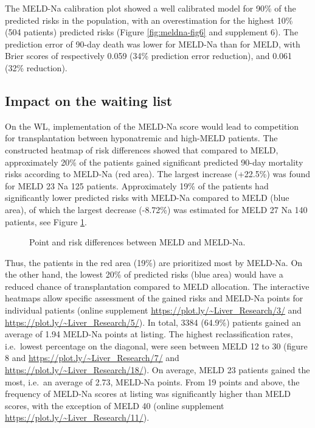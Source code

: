 \documentclass[11pt,english,]{book} %
\begin{document}
The MELD-Na calibration plot showed a well calibrated model for 90\% of the predicted risks in the population, with an overestimation for the highest 10\% (504 patients) predicted risks (Figure \ref{fig:meldna-fig6} and supplement 6). The prediction error of 90-day death was lower for MELD-Na than for MELD, with Brier scores of respectively 0.059 (34\% prediction error reduction), and 0.061 (32\% reduction).

\hypertarget{impact-on-the-waiting-list}{%
\subsection*{Impact on the waiting list}\label{impact-on-the-waiting-list}}

On the WL, implementation of the MELD-Na score would lead to competition for transplantation between hyponatremic and high-MELD patients. The constructed heatmap of risk differences showed that compared to MELD, approximately 20\% of the patients gained significant predicted 90-day mortality risks according to MELD-Na (red area). The largest increase (+22.5\%) was found for MELD 23 Na 125 patients. Approximately 19\% of the patients had significantly lower predicted risks with MELD-Na compared to MELD (blue area), of which the largest decrease (-8.72\%) was estimated for MELD 27 Na 140 patients, see Figure \ref{fig:meldna-fig7}.

\begin{figure}
\newline{}\caption{Point and risk differences between MELD and MELD-Na.}\label{fig:meldna-fig7}
\end{figure}

Thus, the patients in the red area (19\%) are prioritized most by MELD-Na. On the other hand, the lowest 20\% of predicted risks (blue area) would have a reduced chance of transplantation compared to MELD allocation. The interactive heatmaps allow specific assessment of the gained risks and MELD-Na points for individual patients (online supplement \url{https://plot.ly/~Liver_Research/3/} and \url{https://plot.ly/~Liver_Research/5/}). In total, 3384 (64.9\%) patients gained an average of 1.94 MELD-Na points at listing. The highest reclassification rates, i.e.~lowest percentage on the diagonal, were seen between MELD 12 to 30 (figure 8 and \url{https://plot.ly/~Liver_Research/7/} and \url{https://plot.ly/~Liver_Research/18/}). On average, MELD 23 patients gained the most, i.e.~an average of 2.73, MELD-Na points. From 19 points and above, the frequency of MELD-Na scores at listing was significantly higher than MELD scores, with the exception of MELD 40 (online supplement \url{https://plot.ly/~Liver_Research/11/}).
\end{document}
